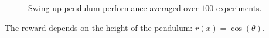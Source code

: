 \begin{figure}
\begin{minipage}{\textwidth}
\centering
{}
\hspace{-.5cm}
\end{minipage}
\caption[Swing-up pendulum results]{Swing-up pendulum performance averaged over $100$ experiments.}\label{F:pendulum}
\end{figure}
The reward depends on the height of the pendulum: $r(x) = \cos(\theta)$.
